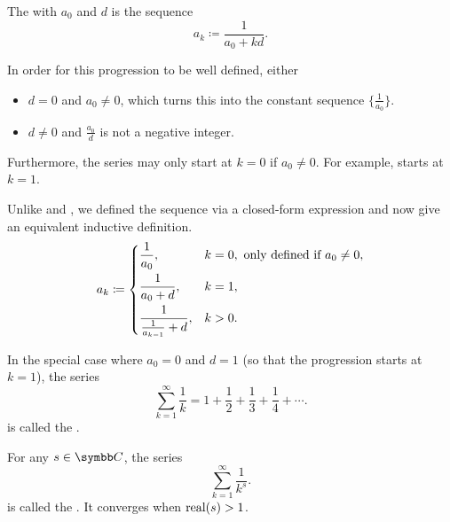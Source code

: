 \begin{definition}\label{def:harmonic_progression}
  The  with  \( a_0 \) and  \( d \) is the sequence
  \begin{equation*}
    a_k \coloneqq \frac 1 {a_0 + kd}.
  \end{equation*}

  \begin{DefEnum}
     In order for this progression to be well defined, either
    \begin{itemize}
      \item \( d = 0 \) and \( a_0 \neq 0 \), which turns this into the constant sequence \( \{ \tfrac 1 {a_0} \} \).

      \item \( d \neq 0 \) and \( \frac {a_0} d \) is not a negative integer.
    \end{itemize}

    Furthermore, the series may only start at \( k = 0 \) if \( a_0 \neq 0 \). For example,  starts at \( k = 1 \).

     Unlike  and , we defined the sequence via a closed-form expression and now give an equivalent inductive definition. \begin{equation*}
      a_k \coloneqq \begin{dcases}
        \frac 1 {a_0},                   & k = 0, \text{ only defined if } a_0 \neq 0, \\
        \frac 1 {a_0 + d},               & k = 1,                                      \\
        \frac 1 {\frac 1 {a_{k-1}} + d}, & k > 0.
      \end{dcases}
    \end{equation*}

     In the special case where \( a_0 = 0 \) and \( d = 1 \) (so that the progression starts at \( k = 1 \)), the series
    \begin{equation}\label{def:harmonic_progression/harmonic_series}
      \sum_{k=1}^\infty \frac 1 k = 1 + \frac 1 2 + \frac 1 3 + \frac 1 4 + \cdots.
    \end{equation}
    is called the .

     For any \( s \in \BC \), the series
    \begin{equation*}
      \sum_{k=1}^\infty \frac 1 {k^s}.
    \end{equation*}
    is called the . It converges when \( \operatorname{real}(s) > 1 \).
  \end{DefEnum}
\end{definition}
